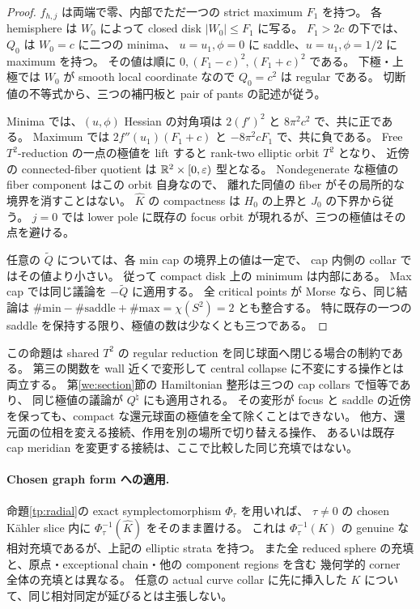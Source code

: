 \begin{proof}
$f_{h,j}$ は両端で零、内部でただ一つの strict maximum $F_1$ を持つ。
各 hemisphere は $W_0$ によって closed disk $|W_0|\le F_1$ に写る。
$F_1>2c$ の下では、$Q_0$ は $W_0=c$ に二つの minima、
$u=u_1,\phi=0$ に saddle、$u=u_1,\phi=1/2$ に maximum を持つ。
その値は順に $0,(F_1-c)^2,(F_1+c)^2$ である。
下極・上極では $W_0$ が smooth local coordinate なので $Q_0=c^2$ は regular である。
切断値の不等式から、三つの補円板と pair of pants の記述が従う。

Minima では、$(u,\phi)$ Hessian の対角項は
$2(f')^2$ と $8\pi^2c^2$ で、共に正である。
Maximum では $2f''(u_1)(F_1+c)$ と $-8\pi^2cF_1$ で、共に負である。
Free $T^2$-reduction の一点の極値を lift すると rank-two elliptic orbit $T^2$ となり、
近傍の connected-fiber quotient は $\mathbb R^2\times[0,\varepsilon)$ 型となる。
Nondegenerate な極値の fiber component はこの orbit 自身なので、
離れた同値の fiber がその局所的な境界を消すことはない。
$\widehat K$ の compactness は $H_0$ の上界と $J_0$ の下界から従う。
$j=0$ では lower pole に既存の focus orbit が現れるが、三つの極値はその点を避ける。

任意の $\widetilde Q$ については、各 min cap の境界上の値は一定で、
cap 内側の collar ではその値より小さい。
従って compact disk 上の minimum は内部にある。
Max cap では同じ議論を $-\widetilde Q$ に適用する。
全 critical points が Morse なら、同じ結論は
$\#\mathrm{min}-\#\mathrm{saddle}+\#\mathrm{max}=\chi(S^2)=2$ とも整合する。
特に既存の一つの saddle を保持する限り、極値の数は少なくとも三つである。
\end{proof}

この命題は shared $T^2$ の regular reduction を同じ球面へ閉じる場合の制約である。
第三の関数を wall 近くで変形して central collapse に不変にする操作とは両立する。
第\ref{we:section}節の Hamiltonian 整形は三つの cap collars で恒等であり、
同じ極値の議論が $Q^\natural$ にも適用される。
その変形が focus と saddle の近傍を保っても、compact な還元球面の極値を全て除くことはできない。
他方、還元面の位相を変える接続、作用を別の場所で切り替える操作、
あるいは既存 cap meridian を変更する接続は、ここで比較した同じ充填ではない。

\paragraph{Chosen graph form への適用.}
命題\ref{tp:radial}の exact symplectomorphism $\Phi_\tau$ を用いれば、
$\tau\ne0$ の chosen K\"ahler slice 内に $\Phi_\tau^{-1}(\widehat K)$ をそのまま置ける。
これは $\Phi_\tau^{-1}(K)$ の genuine な相対充填であるが、上記の elliptic strata を持つ。
また全 reduced sphere の充填と、原点・exceptional chain・他の component regions を含む
幾何学的 corner 全体の充填とは異なる。
任意の actual curve collar に先に挿入した $K$ について、同じ相対同定が延びるとは主張しない。

